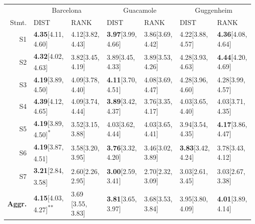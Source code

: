 \begin{table}
\small
    \centering
    \scriptsize
    \begin{tabular}{r | l l | l l | l l}

    & \multicolumn{2}{c|}{Barcelona} & \multicolumn{2}{c|}{Guacamole} & \multicolumn{2}{c}{Guggenheim} \\ 
        Stmt. & DIST & RANK & DIST & RANK & DIST & RANK   \\
        \hline
        
        
        S1 & 
        \textbf{4.35}[4.11, 4.60] & 4.12[3.82, 4.43] &  
        \textbf{3.97}[3.99, 4.66] & 3.86[3.69, 4.42] & 
        4.22[3.88, 4.57]& \textbf{4.36}[4.08, 4.64]\\
        
        S2 &
        \textbf{4.32}[4.02, 4.63]\textsuperscript{\tiny *} & 3.82[3.45, 4.19] &
        3.89[3.45, 4.33] & 3.89[3.53, 4.26]& 
        4.28[3.93, 4.63] & \textbf{4.44}[4.20, 4.69] \\
        
        S3 &
        \textbf{4.19}[3.89, 4.50]& 4.09[3.78, 4.40]&
        \textbf{4.11}[3.70, 4.51]& 4.08[3.69, 4.47]&
        4.28[3.96, 4.60] & 4.28[3.99, 4.57] \\
        
        S4 &
        \textbf{4.39}[4.12, 4.65] & 4.09[3.74, 4.44]&
        \textbf{3.89}[3.42, 4.37]& 3.76[3.35, 4.17]&
        4.03[3.65, 4.40] & 4.03[3.71, 4.35] \\
        
        S5 &
        \textbf{4.19}[3.89, 4.50]\textsuperscript{\tiny **} & 3.52[3.15, 3.88]&
        4.03[3.62, 4.44]& 4.03[3.65, 4.41]&
        3.94[3.54, 4.35] & \textbf{4.17}[3.86, 4.47]\\
        
        S6 &
        \textbf{4.19}[3.87, 4.51]\textsuperscript{\tiny *} & 3.58[3.20, 3.95]& 
        \textbf{3.76}[3.32, 4.20] & 3.46[3.02, 3.89] &
        \textbf{3.83}[3.42, 4.24] & 3.78[3.43, 4.12]\\
        
        S7 &
        \textbf{3.21}[2.84, 3.58]\textsuperscript{\tiny *} & 2.60[2.26, 2.95]&
        \textbf{3.00}[2.59, 3.41]& 2.70[2.32, 3.09]&
        3.03[2.61, 3.45] & 3.03[2.67, 3.38] \\
        
        \hline
        
        \textbf{Aggr.} &
        \textbf{4.15}[4.03, 4.27]\textsuperscript{\tiny ***} & 3.69 [3.55, 3.83]&
        \textbf{3.81}[3.65, 3.97] & 3.68[3.53, 3.84]&
        3.95[3.80, 4.09]& \textbf{4.01}[3.89, 4.14]\\
        

\end{tabular}
\end{table}
